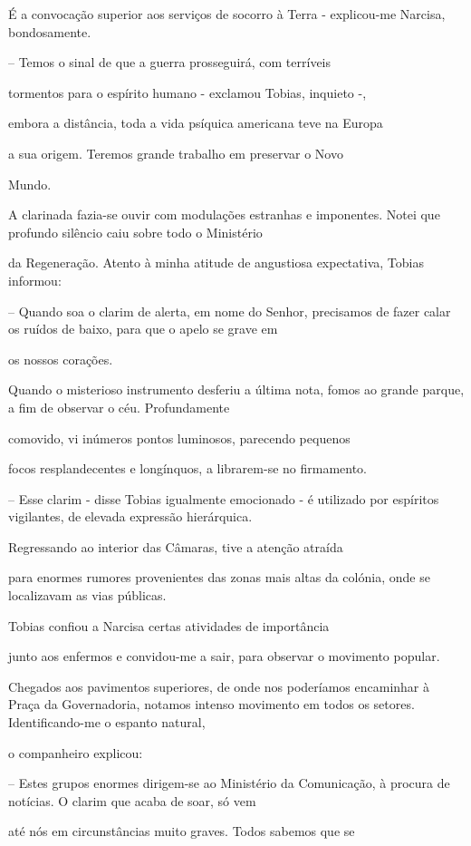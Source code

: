 \documentclass[portuguese,12pt,a4paper]{scrbook}
\begin{document}
	É a convocação superior aos serviços de socorro à Terra - explicou-me Narcisa, bondosamente.
	
	– Temos o sinal de que a guerra prosseguirá, com terríveis
	
	tormentos para o espírito humano - exclamou Tobias, inquieto -,
	
	embora a distância, toda a vida psíquica americana teve na Europa
	
	a sua origem. Teremos grande trabalho em preservar o Novo
	
	Mundo.
	
	A clarinada fazia-se ouvir com modulações estranhas e imponentes. Notei que profundo silêncio caiu sobre todo o Ministério
	
	
	da Regeneração. Atento à minha atitude de angustiosa expectativa, Tobias informou:
	
	– Quando soa o clarim de alerta, em nome do Senhor, precisamos de fazer calar os ruídos de baixo, para que o apelo se grave em
	
	os nossos corações.
	
	Quando o misterioso instrumento desferiu a última nota, fomos ao grande parque, a fim de observar o céu. Profundamente
	
	comovido, vi inúmeros pontos luminosos, parecendo pequenos
	
	focos resplandecentes e longínquos, a librarem-se no firmamento.
	
	– Esse clarim - disse Tobias igualmente emocionado - é utilizado por espíritos vigilantes, de elevada expressão hierárquica.
	
	Regressando ao interior das Câmaras, tive a atenção atraída
	
	para enormes rumores provenientes das zonas mais altas da colónia, onde se localizavam as vias públicas.
	
	Tobias confiou a Narcisa certas atividades de importância
	
	junto aos enfermos e convidou-me a sair, para observar o movimento popular.
	
	Chegados aos pavimentos superiores, de onde nos poderíamos encaminhar à Praça da Governadoria, notamos intenso movimento em todos os setores. Identificando-me o espanto natural,
	
	o companheiro explicou:
	
	– Estes grupos enormes dirigem-se ao Ministério da Comunicação, à procura de notícias. O clarim que acaba de soar, só vem
	
	até nós em circunstâncias muito graves. Todos sabemos que se
	
\end{document}

